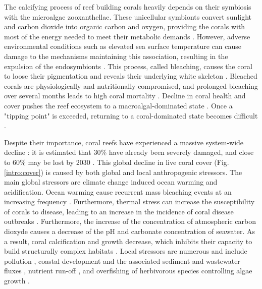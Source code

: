 The calcifying process of reef building corals heavily depends on their symbiosis with the microalgae zooxanthellae. These unicellular symbionts convert sunlight and carbon dioxide into organic carbon and oxygen, providing the corals with most of the energy needed to meet their metabolic demands \citep{muscatine1977reef}. However, adverse environmental conditions such as elevated sea surface temperature can cause damage to the mechanisms maintaining this association, resulting in the expulsion of the endosymbionts \citep{hoegh2007coral}. This process, called bleaching, causes the coral to loose their pigmentation and reveals their underlying white skeleton \citep{baker2008climate}. Bleached corals are physiologically and nutritionally compromised, and prolonged bleaching over several months leads to high coral mortality \citep{hughes2018spatial}. Decline in coral health and cover pushes the reef ecosystem to a macroalgal-dominated state \citep{hughes2003climate,mumby2007thresholds}. Once a "tipping point" is exceeded, returning to a coral-dominated state becomes difficult \citep{mumby2007thresholds,graham2015predicting}.

Despite their importance, coral reefs have experienced a massive system-wide decline \citep{hoegh2007coral}: it is estimated  that 30\% have already been severely damaged, and close to 60\% may be lost by 2030 \citep{hughes2003climate}. This global decline in live coral cover \citep{gardner2003long,pandolfi2003global,bruno2007regional} (Fig. \ref{intro:cover}) is caused by both global and local anthropogenic stressors. The main global stressors are climate change induced ocean warming and acidification. Ocean warming cause recurrent mass bleaching events at an increasing frequency \citep{connell199730, hughes2018spatial}. Furthermore, thermal stress can increase the susceptibility of corals to disease, leading to an increase in the incidence of coral disease outbreaks \citep{harvell2002climate,bruno2007thermal,muller2012caribbean}. Furthermore, the increase of the concentration of atmospheric carbon dioxyde causes a decrease of the pH and carbonate concentration of seawater. As a result, coral calcification and growth decrease, which inhibits their capacity to build structurally complex habitats \citep{hoegh2007coral}. Local stressors are numerous and include pollution \citep{loya1980effects}, coastal development and the associated sediment and wastewater fluxes \citep{erftemeijer2012environmental, cunning2019extensive}, nutrient run-off \citep{hughes2003climate,sheppard2017biology}, and overfishing of herbivorous species controlling algae growth \citep{jackson2001historical}.

